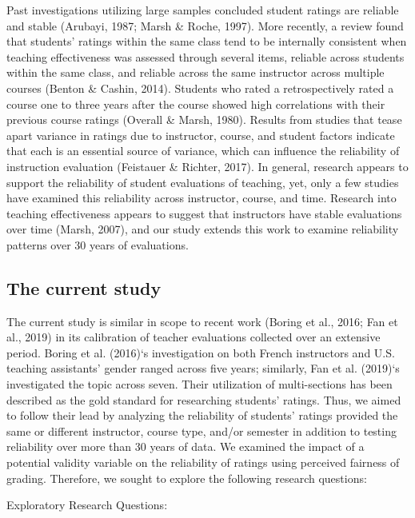 \documentclass[
  man]{apa7}
\begin{document}
Past investigations utilizing large samples concluded student ratings
are reliable and stable (Arubayi, 1987; Marsh \& Roche, 1997). More recently, a
review found that students' ratings within the same class tend to be
internally consistent when teaching effectiveness was assessed through
several items, reliable across students within the same class, and
reliable across the same instructor across multiple courses
(Benton \& Cashin, 2014). Students who rated a retrospectively rated a course one
to three years after the course showed high correlations with their
previous course ratings (Overall \& Marsh, 1980). Results from studies that tease
apart variance in ratings due to instructor, course, and student factors
indicate that each is an essential source of variance, which can
influence the reliability of instruction evaluation (Feistauer \& Richter, 2017). In
general, research appears to support the reliability of student
evaluations of teaching, yet, only a few studies have examined this
reliability across instructor, course, and time. Research into teaching
effectiveness appears to suggest that instructors have stable
evaluations over time (Marsh, 2007), and our study extends this work to
examine reliability patterns over 30 years of evaluations.

\hypertarget{the-current-study}{%
\subsection{The current study}\label{the-current-study}}

The current study is similar in scope to recent work (Boring et al., 2016; Fan et al., 2019) in its calibration of teacher evaluations collected over an
extensive period. Boring et al. (2016)`s investigation on both French instructors
and U.S. teaching assistants' gender ranged across five years;
similarly, Fan et al. (2019)`s investigated the topic across seven. Their
utilization of multi-sections has been described as the gold standard
for researching students' ratings. Thus, we aimed to follow their lead
by analyzing the reliability of students' ratings provided the same or
different instructor, course type, and/or semester in addition to
testing reliability over more than 30 years of data. We examined the
impact of a potential validity variable on the reliability of ratings
using perceived fairness of grading. Therefore, we sought to explore the
following research questions:

Exploratory Research Questions:
\end{document}
